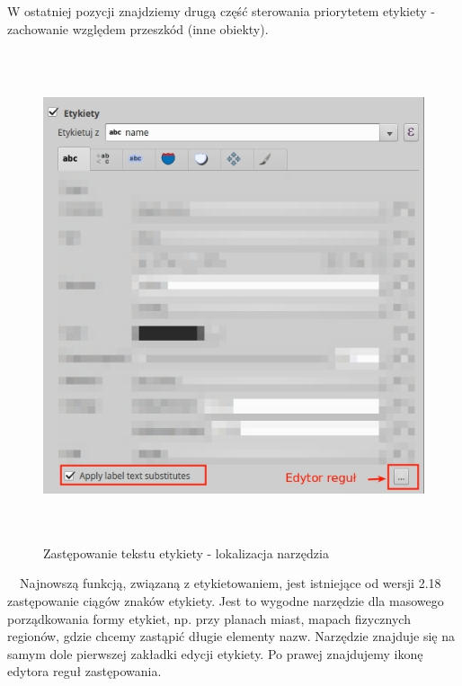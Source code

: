 \documentclass[12pt,a4paper]{book}
\begin{document}
W ostatniej pozycji znajdziemy drugą część sterowania priorytetem etykiety - zachowanie względem przeszkód (inne obiekty).

\begin{center}
\begin{figure}
\includegraphics[width=13.864cm,height=14.42cm]{007-etykiety-subs.jpg}
\caption{Zastępowanie tekstu etykiety - lokalizacja narzędzia}
\end{figure}
\end{center}
\ \ Najnowszą funkcją, związaną z etykietowaniem, jest istniejące od wersji 2.18 zastępowanie ciągów znaków etykiety. Jest to wygodne narzędzie dla masowego porządkowania formy etykiet, np. przy planach miast, mapach fizycznych regionów, gdzie chcemy zastąpić długie elementy nazw. Narzędzie znajduje się na samym dole pierwszej zakładki edycji etykiety. Po prawej znajdujemy ikonę edytora reguł zastępowania.
\end{document}
